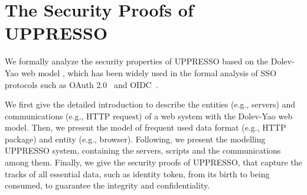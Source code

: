 \appendix

\renewcommand{\algorithmicrequire}{\textbf{Input:}}
\newcommand{\deflet}{\textbf{let}}
\newcommand{\mystate}[1]{\STATE \textbf{let} {{}#1}}
\newcommand{\mystop}[1]{\STATE \textbf{stop} \myss{\myangle{{{}#1}}, s'}}
\newcommand{\myss}[1]{${{}#1}$}
\newcommand{\myangle}[1]{\langle {{}#1} \rangle}
\newcommand{\myif}[1]{\IF{\myss{{{}#1}}}}
\newcommand{\myelse}[1]{\ELSIF{\myss{{{}#1}}}}
\newcommand{\SWITCH}[1]{\STATE \textbf{switch} #1\ \textbf{do} \begin{ALC@g}}
\newcommand{\ENDSWITCH}{\end{ALC@g}\STATE \textbf{end switch}}
\newcommand{\CASE}[1]{\STATE \textbf{case} #1\textbf{:} \begin{ALC@g}}
\newcommand{\ENDCASE}{\end{ALC@g}}
\newcommand{\CASELINE}[1]{\STATE \textbf{case} #1\textbf{:} }
\newcommand{\DEFAULT}{\STATE \textbf{default:} \begin{ALC@g}}
\newcommand{\ENDDEFAULT}{\end{ALC@g}}
\newcommand{\DEFAULTLINE}[1]{\STATE \textbf{default:} }




\section{The Security Proofs of UPPRESSO}
\label{ape:model}
We  formally analyze  the security properties of UPPRESSO based on the Dolev-Yao web model \cite{SPRESSO},
 which has been widely used in the formal analysis of SSO protocols such as OAuth 2.0~\cite{FettKS16} and OIDC~\cite{FettKS17}.

We first give the detailed introduction to describe the entities (e.g., servers) and communications (e.g., HTTP request) of a web system
    with the Dolev-Yao web model.
Then, we present the model of frequent used data format (e.g., HTTP package) and entity  (e.g., browser).
Following, we present the modelling UPPRESSO system, containing the servers, scripts and the communications among them.
Finally, we give the security proofs of UPPRESSO, that capture the tracks of all essential data, such as identity token, from its birth to being consumed, to guarantee the integrity and confidentiality.





